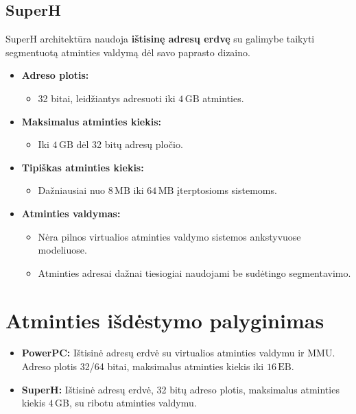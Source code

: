 \documentclass{article}
\begin{document}
\subsection{SuperH}
SuperH architektūra naudoja \textbf{ištisinę adresų erdvę} su galimybe taikyti segmentuotą atminties valdymą dėl savo paprasto dizaino.

\begin{itemize}
    \item \textbf{Adreso plotis:} 
        \begin{itemize}
            \item 32 bitai, leidžiantys adresuoti iki \( 4 \, \text{GB} \) atminties.
        \end{itemize}
    \item \textbf{Maksimalus atminties kiekis:}
        \begin{itemize}
            \item Iki \( 4 \, \text{GB} \) dėl 32 bitų adresų pločio.
        \end{itemize}
    \item \textbf{Tipiškas atminties kiekis:}
        \begin{itemize}
            \item Dažniausiai nuo \( 8 \, \text{MB} \) iki \( 64 \, \text{MB} \) įterptosioms sistemoms.
        \end{itemize}
    \item \textbf{Atminties valdymas:}
        \begin{itemize}
            \item Nėra pilnos virtualios atminties valdymo sistemos ankstyvuose modeliuose.
            \item Atminties adresai dažnai tiesiogiai naudojami be sudėtingo segmentavimo.
        \end{itemize}
\end{itemize}

\section*{Atminties išdėstymo palyginimas}
\begin{itemize}
    \item \textbf{PowerPC:} Ištisinė adresų erdvė su virtualios atminties valdymu ir MMU. Adreso plotis 32/64 bitai, maksimalus atminties kiekis iki \( 16 \, \text{EB} \).
    \item \textbf{SuperH:} Ištisinė adresų erdvė, 32 bitų adreso plotis, maksimalus atminties kiekis \( 4 \, \text{GB} \), su ribotu atminties valdymu.
\end{itemize}
\end{document}
